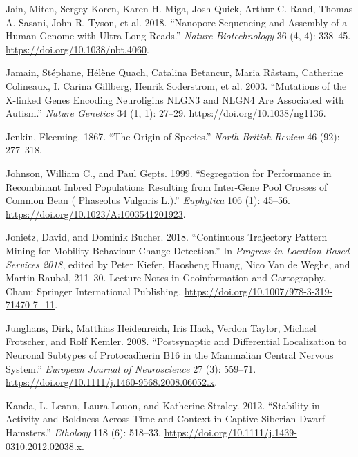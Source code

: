 \documentclass[
]{book}
\newlength{\cslhangindent}
\newlength{\cslentryspacingunit} %
\newenvironment{CSLReferences}[2] %
 {%
  \setlength{\parindent}{0pt}
  \ifodd #1
  \let\oldpar\par
  \def\par{\hangindent=\cslhangindent\oldpar}
  \fi
  \setlength{\parskip}{#2\cslentryspacingunit}
 }%
 {}
\begin{document}
\begin{CSLReferences}{1}{0}
\leavevmode{}%
Jain, Miten, Sergey Koren, Karen H. Miga, Josh Quick, Arthur C. Rand, Thomas A. Sasani, John R. Tyson, et al. 2018. {``Nanopore Sequencing and Assembly of a Human Genome with Ultra-Long Reads.''} \emph{Nature Biotechnology} 36 (4, 4): 338--45. \url{https://doi.org/10.1038/nbt.4060}.

\leavevmode{}%
Jamain, Stéphane, Hélène Quach, Catalina Betancur, Maria Råstam, Catherine Colineaux, I. Carina Gillberg, Henrik Soderstrom, et al. 2003. {``Mutations of the {X-linked} Genes Encoding Neuroligins {NLGN3} and {NLGN4} Are Associated with Autism.''} \emph{Nature Genetics} 34 (1, 1): 27--29. \url{https://doi.org/10.1038/ng1136}.

\leavevmode{}%
Jenkin, Fleeming. 1867. {``The Origin of Species.''} \emph{North British Review} 46 (92): 277--318.

\leavevmode{}%
Johnson, William C., and Paul Gepts. 1999. {``Segregation for Performance in Recombinant Inbred Populations Resulting from Inter-Gene Pool Crosses of Common Bean ( {Phaseolus} Vulgaris {L}.).''} \emph{Euphytica} 106 (1): 45--56. \url{https://doi.org/10.1023/A:1003541201923}.

\leavevmode{}%
Jonietz, David, and Dominik Bucher. 2018. {``Continuous {Trajectory Pattern Mining} for {Mobility Behaviour Change Detection}.''} In \emph{Progress in {Location Based Services} 2018}, edited by Peter Kiefer, Haosheng Huang, Nico Van de Weghe, and Martin Raubal, 211--30. Lecture {Notes} in {Geoinformation} and {Cartography}. {Cham}: {Springer International Publishing}. \url{https://doi.org/10.1007/978-3-319-71470-7_11}.

\leavevmode{}%
Junghans, Dirk, Matthias Heidenreich, Iris Hack, Verdon Taylor, Michael Frotscher, and Rolf Kemler. 2008. {``Postsynaptic and Differential Localization to Neuronal Subtypes of Protocadherin Β16 in the Mammalian Central Nervous System.''} \emph{European Journal of Neuroscience} 27 (3): 559--71. \url{https://doi.org/10.1111/j.1460-9568.2008.06052.x}.

\leavevmode{}%
Kanda, L. Leann, Laura Louon, and Katherine Straley. 2012. {``Stability in {Activity} and {Boldness Across Time} and {Context} in {Captive Siberian Dwarf Hamsters}.''} \emph{Ethology} 118 (6): 518--33. \url{https://doi.org/10.1111/j.1439-0310.2012.02038.x}.


\end{CSLReferences}
\end{document}
